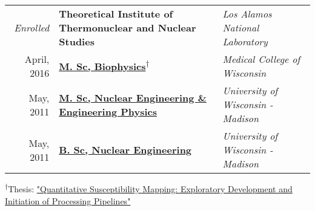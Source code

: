 %
%



\begin{minipage}{\textwidth}
    \begin{tabular}{r|ll}
	    \textit{Enrolled} & \textbf{Theoretical Institute of Thermonuclear and Nuclear Studies} & \emph{Los Alamos National Laboratory} \\ %
	April, 2016 &	\href{https://app.box.com/s/62ffckadt53x8k93p9gp6ylbpqj9vscw}{\textbf{M. Sc, Biophysics}}\textsuperscript{$\dagger$} & \emph{Medical College of Wisconsin} \\ %
	May, 2011 & \href{https://app.box.com/s/yyxi60lex92ovm7dus1d5xu9xshdqd91}{\textbf{M. Sc, Nuclear Engineering \& Engineering Physics}} & \emph{University of Wisconsin - Madison} \\ %
	May, 2011 & \href{https://app.box.com/s/yyxi60lex92ovm7dus1d5xu9xshdqd91}{\textbf{B. Sc, Nuclear Engineering}} & \emph{University of Wisconsin - Madison}\\ %
    \end{tabular}
\end{minipage}

\begin{minipage}{\textwidth}
	\textsuperscript{$\dagger$}Thesis: \href{https://app.box.com/s/o8kksc6n51qpjzc3clfa127xtdfkayzd}{\normalsize"Quantitative Susceptibility Mapping: Exploratory Development and Initiation of Processing Pipelines"}
\end{minipage}

